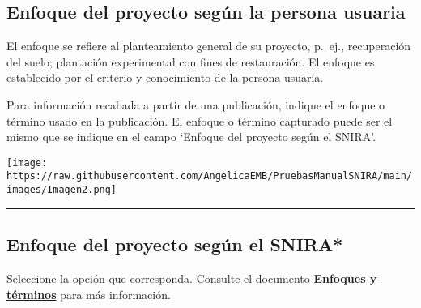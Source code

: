 \documentclass[
]{book}
\begin{document}
\hypertarget{enfoque-del-proyecto-seguxfan-la-persona-usuaria}{%
\subsection*{Enfoque del proyecto según la persona usuaria}\label{enfoque-del-proyecto-seguxfan-la-persona-usuaria}}

El enfoque se refiere al planteamiento general de su proyecto, p.~ej., recuperación del suelo; plantación experimental con fines de restauración. El enfoque es establecido por el criterio y conocimiento de la persona usuaria.

Para información recabada a partir de una publicación, indique el enfoque o término usado en la publicación.
El enfoque o término capturado puede ser el mismo que se indique en el campo `Enfoque del proyecto según el SNIRA'.

\texttt{[image: https://raw.githubusercontent.com/AngelicaEMB/PruebasManualSNIRA/main/images/Imagen2.png]}

\begin{center}\rule{0.5\linewidth}{0.5pt}\end{center}

\hypertarget{enfoque-del-proyecto-seguxfan-el-snira}{%
\subsection*{\texorpdfstring{{Enfoque del proyecto según el SNIRA*}}{Enfoque del proyecto según el SNIRA*}}\label{enfoque-del-proyecto-seguxfan-el-snira}}

Seleccione la opción que corresponda.
Consulte el documento \href{https://drive.google.com/file/d/1jmIbkg1UEZI-FfwHULiqkg-rUJExKsIc/view}{\textbf{Enfoques y términos}} para más información.
\end{document}
